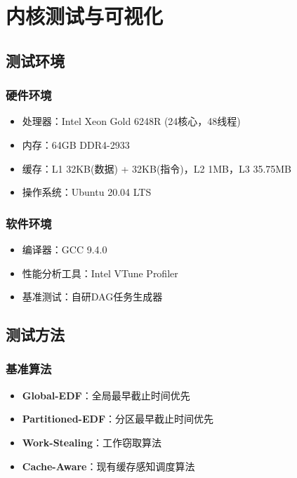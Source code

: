 
\section{内核测试与可视化} \label{sec:test}

\subsection{测试环境}

\subsubsection{硬件环境}
\begin{itemize}
    \item 处理器：Intel Xeon Gold 6248R (24核心，48线程)
    \item 内存：64GB DDR4-2933
    \item 缓存：L1 32KB(数据) + 32KB(指令)，L2 1MB，L3 35.75MB
    \item 操作系统：Ubuntu 20.04 LTS
\end{itemize}

\subsubsection{软件环境}
\begin{itemize}
    \item 编译器：GCC 9.4.0
    \item 性能分析工具：Intel VTune Profiler
    \item 基准测试：自研DAG任务生成器
\end{itemize}

\subsection{测试方法}

\subsubsection{基准算法}
\begin{itemize}
    \item \textbf{Global-EDF}：全局最早截止时间优先
    \item \textbf{Partitioned-EDF}：分区最早截止时间优先
    \item \textbf{Work-Stealing}：工作窃取算法
    \item \textbf{Cache-Aware}：现有缓存感知调度算法
\end{itemize}

